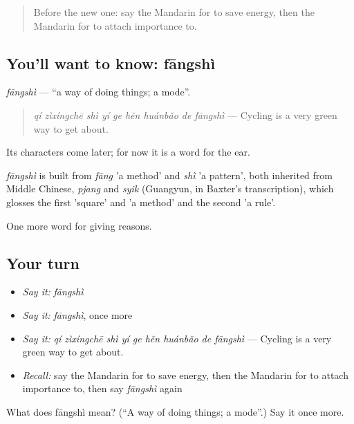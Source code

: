 \label{lesson:ZH-C385-fangshi}



\begin{quote}
Before the new one: say the Mandarin for to save energy, then the Mandarin for to attach importance to.
\end{quote}

\subsection*{You'll want to know: fāngshì}
\emph{fāngshì} — \textquotedblleft{}a way of doing things; a mode\textquotedblright{}.

\begin{quote}
\emph{qí zìxíngchē shì yí ge hěn huánbǎo de fāngshì} — Cycling is a very green way to get about.
\end{quote}

Its characters come later; for now it is a word for the ear.

\begin{cousinweb}
\emph{fāngshì} is built from \emph{fāng} 'a method' and \emph{shì} 'a pattern', both inherited from Middle Chinese, \emph{pjang} and \emph{syik} (Guangyun, in Baxter's transcription), which glosses the first 'square' and 'a method' and the second 'a rule'.
\end{cousinweb}

\begin{grammarlens}[title={What you've built}]
One more word for giving reasons.
\end{grammarlens}

\subsection*{Your turn}
\begin{itemize}
\raggedright
  \item \emph{Say it:} \emph{fāngshì}
  \item \emph{Say it:} \emph{fāngshì}, once more
  \item \emph{Say it:} \emph{qí zìxíngchē shì yí ge hěn huánbǎo de fāngshì} — Cycling is a very green way to get about.
  \item \emph{Recall:} say the Mandarin for to save energy, then the Mandarin for to attach importance to, then say \emph{fāngshì} again
\end{itemize}

\begin{tcolorbox}[breakable,colback=teal!4,colframe=teal!35!black,title={Before you move on}]
What does fāngshì mean? (\textquotedblleft{}A way of doing things; a mode\textquotedblright{}.) Say it once more.
\end{tcolorbox}
